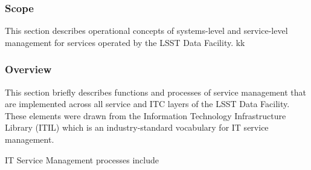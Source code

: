 
\subsubsection{Scope}
This section describes operational concepts of systems-level and service-level
management for services operated by the LSST Data Facility.
kk

\subsubsection{Overview}
This section briefly describes functions and processes of service
management that are implemented across all service and ITC layers of
the LSST Data Facility. These elements were drawn from the Information
Technology Infrastructure Library (ITIL) which is an industry-standard
vocabulary for IT service management.

IT Service Management processes include

